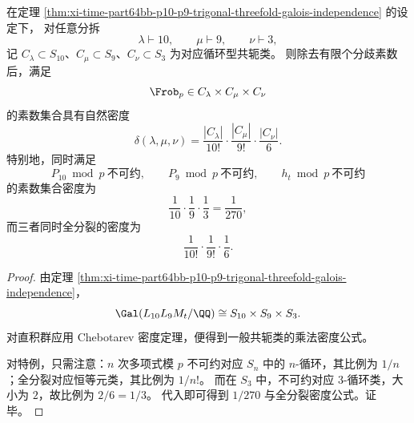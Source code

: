 \begin{corollary}\label{cor:xi-time-part64bb-p10-p9-trigonal-chebotarev-1over270}
在定理 \ref{thm:xi-time-part64bb-p10-p9-trigonal-threefold-galois-independence} 的设定下，
对任意分拆
\[
\lambda\vdash 10,
\qquad
\mu\vdash 9,
\qquad
\nu\vdash 3,
\]
记 \(C_\lambda\subset S_{10}\)、\(C_\mu\subset S_9\)、\(C_\nu\subset S_3\) 为对应循环型共轭类。
则除去有限个分歧素数后，满足
\[
\Frob_p\in C_\lambda\times C_\mu\times C_\nu
\]
的素数集合具有自然密度
\[
\delta(\lambda,\mu,\nu)
=
\frac{|C_\lambda|}{10!}\cdot
\frac{|C_\mu|}{9!}\cdot
\frac{|C_\nu|}{6}.
\]
特别地，同时满足
\[
P_{10}\bmod p\ \text{不可约},
\qquad
P_9\bmod p\ \text{不可约},
\qquad
h_t\bmod p\ \text{不可约}
\]
的素数集合密度为
\[
\frac{1}{10}\cdot\frac{1}{9}\cdot\frac{1}{3}
=
\frac{1}{270},
\]
而三者同时全分裂的密度为
\[
\frac{1}{10!}\cdot \frac{1}{9!}\cdot \frac{1}{6}.
\]
\end{corollary}
\begin{proof}
由定理 \ref{thm:xi-time-part64bb-p10-p9-trigonal-threefold-galois-independence}，
\[
\Gal(L_{10}L_9M_t/\QQ)\cong S_{10}\times S_9\times S_3.
\]
对直积群应用 Chebotarev 密度定理，便得到一般共轭类的乘法密度公式。

对特例，只需注意：\(n\) 次多项式模 \(p\) 不可约对应 \(S_n\) 中的 \(n\)-循环，其比例为 \(1/n\)；全分裂对应恒等元类，其比例为 \(1/n!\)。
而在 \(S_3\) 中，不可约对应 \(3\)-循环类，大小为 \(2\)，故比例为 \(2/6=1/3\)。
代入即可得到 \(1/270\) 与全分裂密度公式。证毕。
\end{proof}

